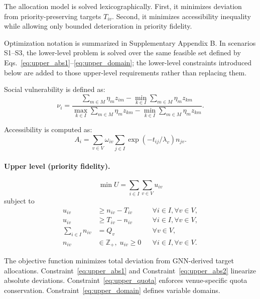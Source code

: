 \documentclass[final,5p,times,twocolumn,authoryear]{elsarticle}
\begin{document}
The allocation model is solved lexicographically. First, it minimizes deviation from
priority-preserving targets $T_{iv}$. Second, it minimizes accessibility inequality while
allowing only bounded deterioration in priority fidelity.

Optimization notation is summarized in Supplementary Appendix B.
In scenarios S1--S3, the lower-level problem is solved over the same feasible set defined by
Eqs.~\eqref{eq:upper_abs1}--\eqref{eq:upper_domain}; the lower-level constraints introduced
below are added to those upper-level requirements rather than replacing them.

Social vulnerability is defined as:
\begin{equation}
\nu_i = \frac{\sum_{m\in M} \eta_m z_{im} - \min_{k\in I}\sum_{m\in M} \eta_m z_{km}}
{\max_{k\in I}\sum_{m\in M} \eta_m z_{km} - \min_{k\in I}\sum_{m\in M} \eta_m z_{km}}.
\label{eq:vulnerability}
\end{equation}

Accessibility is computed as:
\begin{equation}
A_i = \sum_{v\in V}\omega_{iv}\sum_{j\in I}\exp(-t_{ij}/\lambda_v)n_{jv}.
\label{eq:accessibility}
\end{equation}

\paragraph{Upper level (priority fidelity).}
\begin{equation}
\min U=\sum_{i\in I}\sum_{v\in V}u_{iv}
\label{eq:upper_obj}
\end{equation}
subject to
\begin{align}
u_{iv} &\ge n_{iv}-T_{iv} && \forall i\in I,\forall v\in V, \label{eq:upper_abs1} \\
u_{iv} &\ge T_{iv}-n_{iv} && \forall i\in I,\forall v\in V, \label{eq:upper_abs2} \\
\sum_{i\in I}n_{iv} &= Q_v && \forall v\in V, \label{eq:upper_quota} \\
n_{iv} &\in \mathbb{Z}_{+},\; u_{iv}\ge 0 && \forall i\in I,\forall v\in V. \label{eq:upper_domain}
\end{align}

The objective function minimizes total deviation from GNN-derived target allocations.
Constraint~\eqref{eq:upper_abs1} and Constraint~\eqref{eq:upper_abs2} linearize absolute
deviations. Constraint~\eqref{eq:upper_quota} enforces venue-specific quota conservation.
Constraint~\eqref{eq:upper_domain} defines variable domains.
\end{document}
